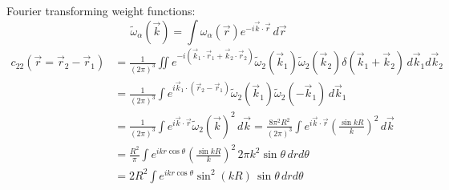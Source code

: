 \documentclass[12pt]{report}
\begin{document}
Fourier transforming weight functions:
\begin{equation}
  \widetilde{\omega}_\alpha(\vec{k}) =
  \int \omega_\alpha (\vec{r}) e^{-i \vec{k}\cdot\vec{r}} \, d\vec{r}
\end{equation}
\begin{equation}
  \begin{aligned}
    c_{22}(\vec{r} = \vec{r}_2 - \vec{r}_1) &=
    \frac{1}{(2\pi)^3}
    \iint
    e^{-i (\vec{k}_1\cdot\vec{r}_1 + \vec{k}_2\cdot\vec{r}_2)}
    \widetilde{\omega}_2(\vec{k}_1)
    \widetilde{\omega}_2(\vec{k}_2)
    \delta{(\vec{k}_1 + \vec{k}_2)}
    \, d\vec{k}_1 d\vec{k}_2 \\
    &=
    \frac{1}{(2\pi)^3}
    \int
    e^{i \vec{k}_1 \cdot (\vec{r}_2 - \vec{r}_1)}
    \widetilde{\omega}_2(\vec{k}_1)
    \widetilde{\omega}_2(-\vec{k}_1)
    \, d\vec{k}_1 \\
    &=
    \frac{1}{(2\pi)^3}
    \int
    e^{i \vec{k} \cdot \vec{r}}
    \widetilde{\omega}_2(\vec{k})^2
    \, d\vec{k}
    =
    \frac{8\pi^2 R^2}{(2\pi)^3}
    \int
    e^{i \vec{k} \cdot \vec{r}}
    \left( \frac{\sin{kR}}{k} \right)^2
    \, d\vec{k} \\
    &=
    \frac{R^2}{\pi}
    \int
    e^{i k r \cos\theta}
    \left( \frac{\sin{kR}}{k} \right)^2
    \, 2\pi k^2 \sin\theta \, dr d\theta \\
    &=
    2 R^2
    \int
    e^{i k r \cos\theta}
    \sin^2{(kR)}
    \, \sin\theta \, dr d\theta
  \end{aligned}
\end{equation}
\end{document}
